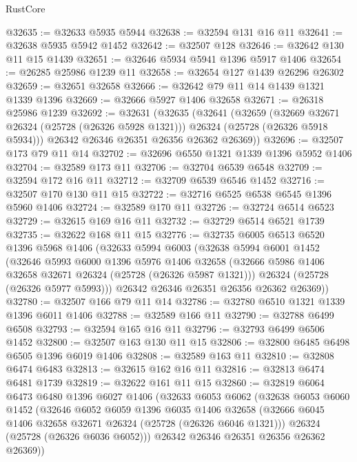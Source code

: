 \begin{lexlean}{RustCore}
\begin{coremodule}
@32635 := @32633 @5935 @5944
@32638 := @32594 @131 @16 @11
@32641 := @32638 @5935 @5942 @1452
@32642 := @32507 @128
@32646 := @32642 @130 @11 @15 @1439
@32651 := @32646 @5934 @5941 @1396 @5917 @1406
@32654 := @26285 @25986 @1239 @11
@32658 := @32654 @127 @1439 @26296 @26302
@32659 := @32651 @32658
@32666 := @32642 @79 @11 @14 @1439 @1321 @1339 @1396
@32669 := @32666 @5927 @1406 @32658
@32671 := @26318 @25986 @1239
@32692 := @32631
    (@32635
      (@32641
        (@32659
          (@32669 @32671 @26324 (@25728 (@26326 @5928 @1321)))
          @26324
          (@25728 (@26326 @5918 @5934)))
        @26342
        @26346
        @26351
        @26356
        @26362
        @26369))
@32696 := @32507 @173 @79 @11 @14
@32702 := @32696 @6550 @1321 @1339 @1396 @5952 @1406
@32704 := @32589 @173 @11
@32706 := @32704 @6539 @6548
@32709 := @32594 @172 @16 @11
@32712 := @32709 @6539 @6546 @1452
@32716 := @32507 @170 @130 @11 @15
@32722 := @32716 @6525 @6538 @6545 @1396 @5960 @1406
@32724 := @32589 @170 @11
@32726 := @32724 @6514 @6523
@32729 := @32615 @169 @16 @11
@32732 := @32729 @6514 @6521 @1739
@32735 := @32622 @168 @11 @15
@32776 := @32735
    @6005
    @6513
    @6520
    @1396
    @5968
    @1406
    (@32633
      @5994
      @6003
      (@32638
        @5994
        @6001
        @1452
        (@32646
          @5993
          @6000
          @1396
          @5976
          @1406
          @32658
          (@32666 @5986 @1406 @32658 @32671 @26324 (@25728 (@26326 @5987 @1321)))
          @26324
          (@25728 (@26326 @5977 @5993)))
        @26342
        @26346
        @26351
        @26356
        @26362
        @26369))
@32780 := @32507 @166 @79 @11 @14
@32786 := @32780 @6510 @1321 @1339 @1396 @6011 @1406
@32788 := @32589 @166 @11
@32790 := @32788 @6499 @6508
@32793 := @32594 @165 @16 @11
@32796 := @32793 @6499 @6506 @1452
@32800 := @32507 @163 @130 @11 @15
@32806 := @32800 @6485 @6498 @6505 @1396 @6019 @1406
@32808 := @32589 @163 @11
@32810 := @32808 @6474 @6483
@32813 := @32615 @162 @16 @11
@32816 := @32813 @6474 @6481 @1739
@32819 := @32622 @161 @11 @15
@32860 := @32819
    @6064
    @6473
    @6480
    @1396
    @6027
    @1406
    (@32633
      @6053
      @6062
      (@32638
        @6053
        @6060
        @1452
        (@32646
          @6052
          @6059
          @1396
          @6035
          @1406
          @32658
          (@32666 @6045 @1406 @32658 @32671 @26324 (@25728 (@26326 @6046 @1321)))
          @26324
          (@25728 (@26326 @6036 @6052)))
        @26342
        @26346
        @26351
        @26356
        @26362
        @26369))

\end{coremodule}
\end{lexlean}
